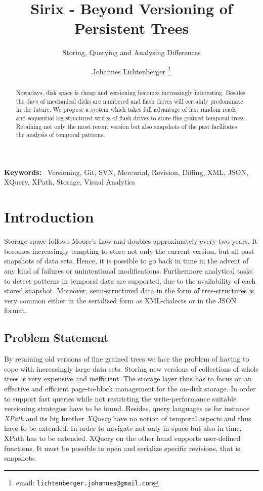\documentclass[10pt,twoside,a4paper,twocolumn,abstracton]{scrartcl}
\newenvironment{keywords}%
   {\begin{trivlist}\item[]{\bfseries\sffamily Keywords:}\ }
   {\end{trivlist}}
\begin{document}
\title{Sirix - Beyond Versioning of Persistent Trees}
\subtitle{Storing, Querying and Analysing Differences}
\author{Johannes Lichtenberger \thanks{email: \texttt{lichtenberger.johannes@gmail.com}}}

\maketitle

\begin{abstract}
Nowadays, disk space is cheap and versioning becomes increasingly interesting. Besides, the days of mechanical disks are numbered and flash drives will certainly predominate in the future. We propose a system which takes full advantage of fast random reads and sequential log-structured writes of flash drives to store fine grained temporal trees. Retaining not only the most recent version but also snapshots of the past facilitates the analysis of temporal patterns.
\end{abstract}

\begin{keywords}
Versioning, Git, SVN, Mercurial, Revision, Diffing, XML, JSON, XQuery, XPath, Storage, Visual Analytics
\end{keywords}

\section{Introduction}
Storage space follows Moore's Law and doubles approximately every two years. It becomes increasingly tempting to store not only the current version, but all past snapshots of data sets. Hence, it is possible to go back in time in the advent of any kind of failures or unintentional modifications. Furthermore analytical tasks to detect patterns in temporal data are supported, due to the availability of each stored snapshot. Moreover, semi-structured data in the form of tree-structures is very common either in the serialized form as XML-dialects or in the JSON format.

\subsection{Problem Statement}
By retaining old versions of fine grained trees we face the problem of having to cope with increasingly large data sets. Storing new versions of collections of whole trees is very expensive and inefficient. The storage layer thus has to focus on an effective and efficient page-to-block management for the on-disk storage. In order to support fast queries while not restricting the write-performance suitable versioning strategies have to be found. Besides, query languages as for instance \emph{XPath} and its big brother \emph{XQuery} have no notion of temporal aspects and thus have to be extended. In order to navigate not only in space but also in time, XPath has to be extended. XQuery on the other hand supports user-defined functions. It must be possible to open and serialize specific revisions, that is snapshots.
\end{document}
